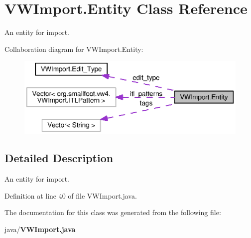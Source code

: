 \section{V\-W\-Import.\-Entity Class Reference}
\label{classorg_1_1smallfoot_1_1vw4_1_1VWImport_1_1Entity}


An entity for import.  




Collaboration diagram for V\-W\-Import.\-Entity\-:\nopagebreak
\begin{figure}[H]
\begin{center}
\leavevmode
\includegraphics[width=350pt]{classorg_1_1smallfoot_1_1vw4_1_1VWImport_1_1Entity__coll__graph}
\end{center}
\end{figure}


\subsection{Detailed Description}
An entity for import. 

Definition at line 40 of file V\-W\-Import.\-java.



The documentation for this class was generated from the following file\-:\begin{DoxyCompactItemize}
\item 
java/{\bf V\-W\-Import.\-java}\end{DoxyCompactItemize}
